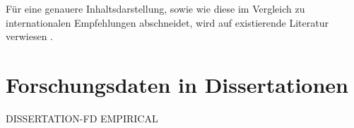 Für eine genauere Inhaltsdarstellung, sowie wie diese im Vergleich zu internationalen Empfehlungen abschneidet, wird auf existierende Literatur verwiesen \autocite{Hiemenz2018-fdm-report}.

\section{Forschungsdaten in Dissertationen}\label{sec:forschungsstand-diss}
DISSERTATION-FD EMPIRICAL
\autocite{Weisbrod2017eDissPlus,Weisbrod2018,dnb2017}
\autocite{Wünsche2018Forschungsdaten}
\autocite{Schöpfel2015}
